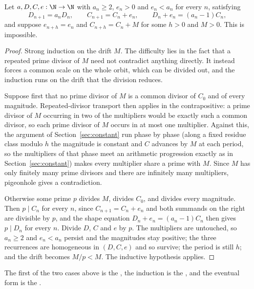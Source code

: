 \begin{theorem}\label{res:periodic}
Let $a,D,C,e:\N\to\N$ with $a_n\ge2$, $e_n>0$ and $e_n<a_n$ for every $n$,
satisfying
\[
 D_{n+1}=a_nD_n,\qquad C_{n+1}=C_n+e_n,\qquad D_n+e_n=(a_n-1)C_n ,
\]
and suppose $e_{n+h}=e_n$ and $C_{n+h}=C_n+M$ for some $h>0$ and $M>0$.  This
is impossible.
\end{theorem}

\begin{proof}
Strong induction on the drift $M$.  The difficulty lies in the fact that a
repeated prime divisor of $M$ need not contradict anything directly.  It
instead forces a common scale on the whole orbit, which can be divided out, and
the induction runs on the drift that the division reduces.

Suppose first that no prime divisor of $M$ is a common divisor of $C_0$ and of
every magnitude.  Repeated-divisor transport then applies in the
contrapositive: a prime divisor of $M$ occurring in two of the multipliers
would be exactly such a common divisor, so each prime divisor of $M$ occurs in
at most one multiplier.  Against this, the argument of
Section~\ref{sec:constant} run phase by phase (along a fixed residue class
modulo $h$ the magnitude is constant and $C$ advances by $M$ at each period, so
the multipliers of that phase meet an arithmetic progression exactly as in
Section~\ref{sec:constant}) makes every multiplier share a prime with $M$.
Since $M$ has only finitely many prime divisors and there are infinitely many
multipliers, pigeonhole gives a contradiction.

Otherwise some prime $p$ divides $M$, divides $C_0$, and divides every
magnitude.  Then $p\mid C_n$ for every $n$, since $C_{n+1}=C_n+e_n$ and both
summands on the right are divisible by $p$, and the shape equation
$D_n+e_n=(a_n-1)C_n$ then gives $p\mid D_n$ for every $n$.  Divide $D$, $C$ and
$e$ by $p$.  The multipliers are untouched, so $a_n\ge2$ and $e_n<a_n$ persist
and the magnitudes stay positive; the three recurrences are homogeneous in
$(D,C,e)$ and so survive; the period is still $h$; and the drift becomes
$M/p<M$.  The inductive hypothesis applies.
\end{proof}

\noindent The first of the two cases above is the
, the induction is the
, and the eventual form is the
.

